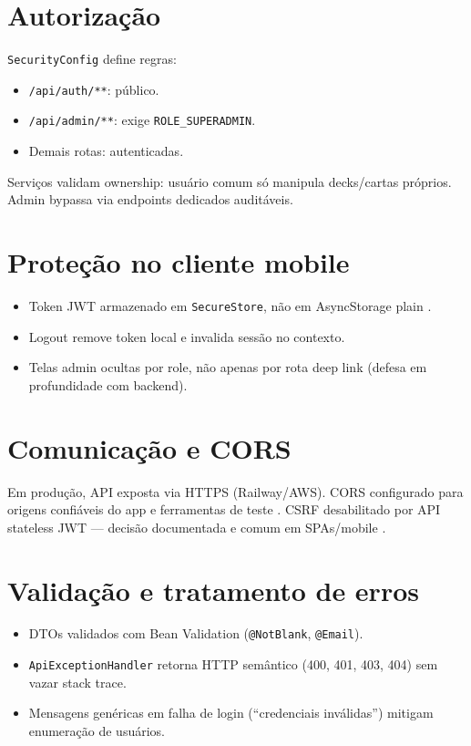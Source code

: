 \section{Autorização}

\texttt{SecurityConfig} define regras:

\begin{itemize}
    \item \texttt{/api/auth/**}: público.
    \item \texttt{/api/admin/**}: exige \texttt{ROLE\_SUPERADMIN}.
    \item Demais rotas: autenticadas.
\end{itemize}

Serviços validam ownership: usuário comum só manipula decks/cartas próprios. Admin bypassa via endpoints dedicados auditáveis.

\section{Proteção no cliente mobile}

\begin{itemize}
    \item Token JWT armazenado em \texttt{SecureStore}, não em AsyncStorage plain \cite{expo_secure_store}.
    \item Logout remove token local e invalida sessão no contexto.
    \item Telas admin ocultas por role, não apenas por rota deep link (defesa em profundidade com backend).
\end{itemize}

\section{Comunicação e CORS}

Em produção, API exposta via HTTPS (Railway/AWS). CORS configurado para origens confiáveis do app e ferramentas de teste \cite{helmet_cors_spring}. CSRF desabilitado por API stateless JWT --- decisão documentada e comum em SPAs/mobile \cite{spring_security_jwt}.

\section{Validação e tratamento de erros}

\begin{itemize}
    \item DTOs validados com Bean Validation (\texttt{@NotBlank}, \texttt{@Email}).
    \item \texttt{ApiExceptionHandler} retorna HTTP semântico (400, 401, 403, 404) sem vazar stack trace.
    \item Mensagens genéricas em falha de login (``credenciais inválidas'') mitigam enumeração de usuários.
\end{itemize}

